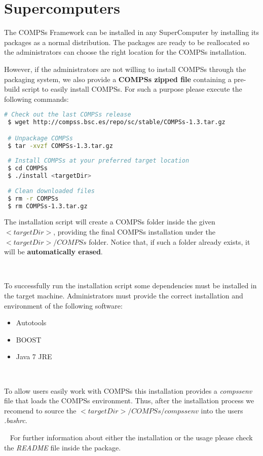 \section{Supercomputers}
\label{sec:Supercomputers}

The COMPSs Framework can be installed in any SuperComputer by installing its packages as a normal distribution. The packages are
ready to be reallocated so the administrators can choose the right location for the COMPSs installation. \newline

However, if the administrators are not willing to install COMPSs through the packaging system, we also provide a \textbf{COMPSs zipped file} containing
a pre-build script to easily install COMPSs. For such a purpose please execute the following commands:
\begin{lstlisting}[language=bash]
 # Check out the last COMPSs release
 $ wget http://compss.bsc.es/repo/sc/stable/COMPSs-1.3.tar.gz

 # Unpackage COMPSs
 $ tar -xvzf COMPSs-1.3.tar.gz
 
 # Install COMPSs at your preferred target location
 $ cd COMPSs
 $ ./install <targetDir>
 
 # Clean downloaded files
 $ rm -r COMPSs
 $ rm COMPSs-1.3.tar.gz
\end{lstlisting}

The installation script will create a COMPSs folder inside the given $<targetDir>$, providing the final COMPSs installation 
under the $<targetDir>/COMPSs$ folder. Notice that, if such a folder already exists, it will be \textbf{automatically erased}.

~ \newline

To successfully run the installation script some dependencies must be installed in the target machine. Administrators must provide the correct
installation and environment of the following software:
\begin{itemize}
 \item Autotools
 \item BOOST
 \item Java 7 JRE
\end{itemize}

~ \newline

To allow users easily work with COMPSs this installation provides a \textit{compssenv} file that loads the COMPSs environment. Thus, after the 
installation process we recomend to source the $<targetDir>/COMPSs/compssenv$ into the users \textit{.bashrc}.


~ \newline
For further information about either the installation or the usage please check the \textit{README} file inside the package. 
